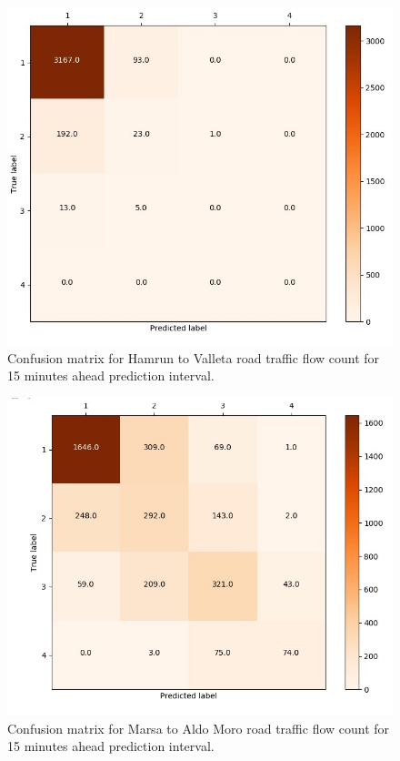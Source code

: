 \documentclass[12pt, a4paper]{report}
\theoremstyle{definition}
\theoremstyle{definition}%
\theoremstyle{definition}%
\theoremstyle{definition}%
\theoremstyle{definition}%
\theoremstyle{definition}%
\begin{document}
\begin{figure}[h]	
	\includegraphics[scale=0.5]{confusion_matrix_hamrun_valletta_342_4bin_15min.jpg}
	\centering
	\caption[Confusion matrix Hamrun to Valletta traffic flow prediction]{Confusion matrix for Hamrun to Valleta road traffic flow count for 15 minutes ahead prediction interval.}
	\label{fig:confusion_matrix_hamrun_valletta_15min}
\end{figure}

\begin{figure}[h]	
	\includegraphics[scale=0.5]{confusion_matrix_marsa_aldo_moro_342_4bin_15min.jpg}
	\centering
	\caption[Confusion matrix Marsa to Aldo Moro traffic flow prediciton]{Confusion matrix for Marsa to Aldo Moro road traffic flow count for 15 minutes ahead prediction interval.}
	\label{fig:confusion_matrix_marsa_aldo_moro_15min}
\end{figure}
\end{document}
